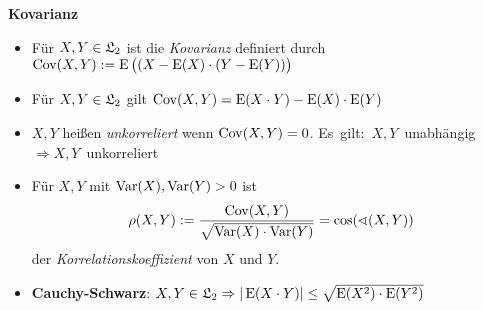 \textbf{Kovarianz}
\begin{itemize}
\item Für $X,Y\in\mathfrak{L}_2$ ist die \textit{Kovarianz} definiert durch
\mbox{$\operatorname{Cov}(X,Y):=\operatorname{E}\big((X-\operatorname{E}(X)\cdot (Y-\operatorname{E}(Y))\big)$}

\item Für $X,Y\in\mathfrak{L}_2$ gilt $\operatorname{Cov}(X,Y)=\operatorname{E}(X\cdot Y)-\operatorname{E}(X)\cdot\operatorname{E}(Y)$

\item $X,Y$ heißen \textit{unkorreliert} wenn $\operatorname{Cov}(X,Y)=0$.
\mbox{Es gilt: $X,Y$ unabhängig $\Rightarrow X,Y$ unkorreliert}
\marginpar{\vspace{-3.45em}\begin{equation}\label{unabhaengig_kor}\end{equation}}

\item Für $X,Y$ mit $\operatorname{Var}(X),\operatorname{Var}(Y)>0$ ist
\[
	\rho(X,Y):=\frac{\operatorname{Cov}(X,Y)}{\sqrt{\operatorname{Var}(X)\cdot\operatorname{Var}(Y)}} = 
	\cos(\sphericalangle (X,Y))
\]
der \textit{Korrelationskoeffizient} von $X$ und $Y$.

\item \textbf{Cauchy-Schwarz}: $X,Y\in\mathfrak{L}_2
\Rightarrow |\operatorname{E}(X\cdot Y)|\leq \sqrt{\operatorname{E}(X^2)\cdot\operatorname{E}(Y^2)}$
\end{itemize}

